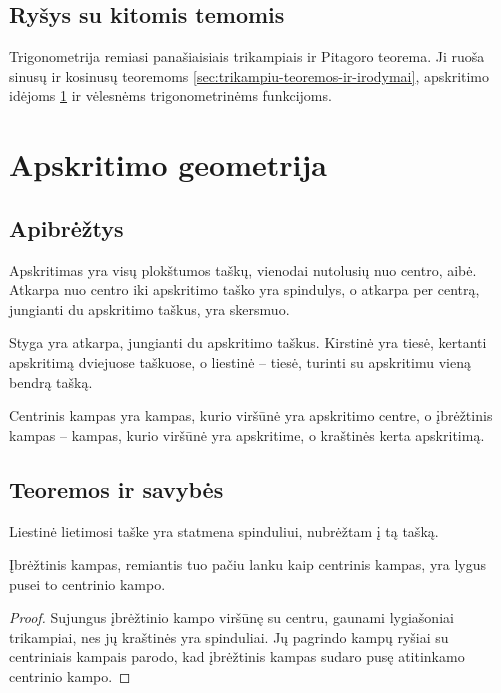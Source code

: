 \subsection{Ryšys su kitomis temomis}

Trigonometrija remiasi panašiaisiais trikampiais ir Pitagoro teorema. Ji ruoša sinusų ir kosinusų teoremoms \ref{sec:trikampiu-teoremos-ir-irodymai}, apskritimo idėjoms \ref{sec:apskritimo-geometrija} ir vėlesnėms trigonometrinėms funkcijoms.

\section{Apskritimo geometrija}\label{sec:apskritimo-geometrija}

\subsection{Apibrėžtys}

\begin{apibreztis}
Apskritimas yra visų plokštumos taškų, vienodai nutolusių nuo centro, aibė. Atkarpa nuo centro iki apskritimo taško yra spindulys, o atkarpa per centrą, jungianti du apskritimo taškus, yra skersmuo.
\end{apibreztis}

\begin{apibreztis}
Styga yra atkarpa, jungianti du apskritimo taškus. Kirstinė yra tiesė, kertanti apskritimą dviejuose taškuose, o liestinė -- tiesė, turinti su apskritimu vieną bendrą tašką.
\end{apibreztis}

\begin{apibreztis}
Centrinis kampas yra kampas, kurio viršūnė yra apskritimo centre, o įbrėžtinis kampas -- kampas, kurio viršūnė yra apskritime, o kraštinės kerta apskritimą.
\end{apibreztis}

\subsection{Teoremos ir savybės}

\begin{savybe}
Liestinė lietimosi taške yra statmena spinduliui, nubrėžtam į tą tašką.
\end{savybe}

\begin{teorema}
Įbrėžtinis kampas, remiantis tuo pačiu lanku kaip centrinis kampas, yra lygus pusei to centrinio kampo.
\end{teorema}
\begin{proof}
Sujungus įbrėžtinio kampo viršūnę su centru, gaunami lygiašoniai trikampiai, nes jų kraštinės yra spinduliai. Jų pagrindo kampų ryšiai su centriniais kampais parodo, kad įbrėžtinis kampas sudaro pusę atitinkamo centrinio kampo.
\end{proof}

